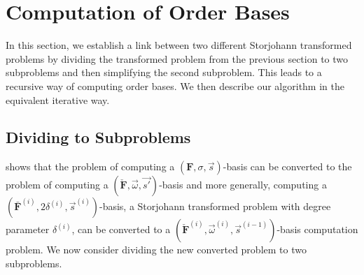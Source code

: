 
\section{Computation of Order Bases}

\label{sec:Order-Basis-Computation}

In this section, we establish a link between two different Storjohann
transformed problems by dividing the transformed problem from the
previous section to two subproblems and then simplifying the second
subproblem. This leads to a recursive way of computing order bases.
We then describe our algorithm in the equivalent iterative way.


\subsection{\label{sub:Dividing-to-Subproblems}Dividing to Subproblems }

 shows that the problem of computing a $\left(\mathbf{F},\sigma,\vec{s}\right)$-basis
can be converted to the problem of computing a $(\check{\mathbf{F}},\vec{\omega},\vec{s'})$-basis
and more generally, computing a $(\bar{\mathbf{F}}^{\left(i\right)},2\delta^{\left(i\right)},\vec{s}^{\left(i\right)})$-basis,
a Storjohann transformed problem with degree parameter $\delta^{\left(i\right)}$,
can be converted to a $(\check{\mathbf{F}}^{\left(i\right)},\vec{\omega}^{\left(i\right)},\vec{s}^{\left(i-1\right)})$-basis
computation problem. We now consider dividing the new converted problem
to two subproblems.

